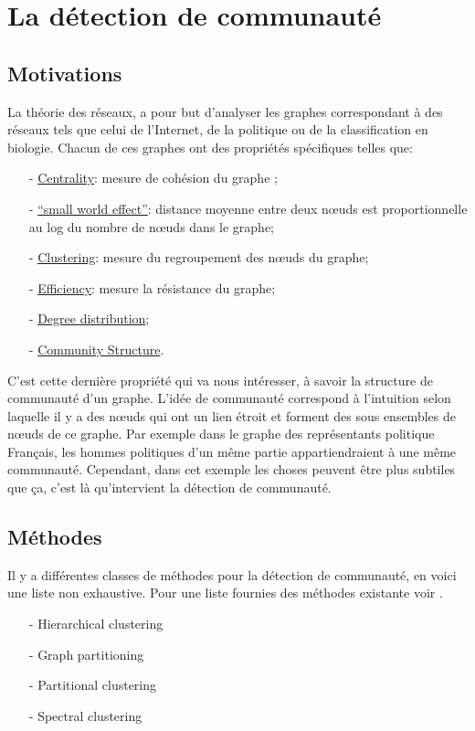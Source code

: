 \section{La détection de communauté}
\subsection{Motivations}
La théorie des réseaux, a pour but d'analyser les graphes correspondant à des réseaux tels que celui de l'Internet, de la politique ou de la classification en biologie.
Chacun de ces graphes ont des propriétés spécifiques telles que:
\begin{itemize}
 	\item[-] \underline{Centrality}: mesure de cohésion du graphe ;
 	\item[-] \underline{``small world effect''}:  distance moyenne entre deux nœuds est proportionnelle au log du nombre de nœuds dans le graphe;
 	\item[-] \underline{Clustering}: mesure du regroupement des nœuds du graphe;
 	\item[-] \underline{Efficiency}: mesure la résistance du graphe;
 	\item[-] \underline{Degree distribution}; 
 	\item[-] \underline{Community Structure}.\\
 \end{itemize}
C'est cette dernière propriété qui va nous intéresser, à savoir la structure de communauté d'un graphe.
L'idée de communauté correspond à l'intuition selon laquelle il y a des nœuds qui ont un lien étroit et forment des sous ensembles de nœuds de ce graphe.
Par exemple dans le graphe des représentants politique Français, les hommes politiques d'un même partie appartiendraient à une même communauté.
Cependant, dans cet exemple les choses peuvent être plus subtiles que ça, c'est là qu'intervient la détection de communauté.

\subsection{Méthodes}
Il y a différentes classes de méthodes pour la détection de communauté, en voici une liste non exhaustive.
Pour une liste fournies des méthodes existante voir \cite{Community_detection_in_graphs}.
\begin{itemize}
	\item[-] Hierarchical clustering
	\item[-] Graph partitioning
	\item[-] Partitional clustering
	\item[-] Spectral clustering \\
\end{itemize}


